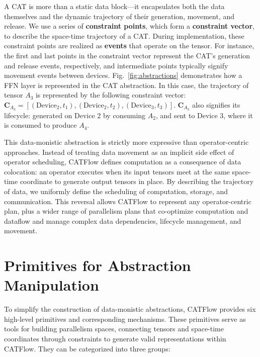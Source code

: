 \documentclass[letterpaper,twocolumn,10pt]{article}
\newcommand{\name}{CATFlow}
\begin{document}
A CAT is more than a static data block—it encapsulates both the data themselves and the dynamic trajectory of their generation, movement, and release. We use a series of \textbf{constraint points}, which form a \textbf{constraint vector}, to describe the space-time trajectory of a CAT. During implementation, these constraint points are realized as \textbf{events} that operate on the tensor. For instance, the first and last points in the constraint vector represent the CAT's generation and release events, respectively, and intermediate points typically signify movement events between devices. Fig.~\ref{fig:abstractions} demonstrates how a FFN layer is represented in the CAT abstraction. In this case, the trajectory of tensor $A_3$ is represented by the following constraint vector: $\mathbf{C}_{A_3} = [(\mathrm{Device}_2, t_1), (\mathrm{Device}_2, t_2), (\mathrm{Device}_3, t_3)]$. $\mathbf{C}_{A_3}$ also signifies its lifecycle: generated on Device 2 by consuming $A_2$, and sent to Device 3, where it is consumed to produce $A_4$.

This data-monistic abstraction is strictly more expressive than operator-centric approaches. Instead of treating data movement as an implicit side effect of operator scheduling, \name{} defines computation as a consequence of data colocation: an operator executes when its input tensors meet at the same space-time coordinate to generate output tensors in place. By describing the trajectory of data, we uniformly define the scheduling of computation, storage, and communication. This reversal allows \name{} to represent any operator-centric plan, plus a wider range of parallelism plans that co-optimize computation and dataflow and manage complex data dependencies, lifecycle management, and movement.

\section{Primitives for Abstraction Manipulation}
\label{sec:primitives}


To simplify the construction of data-monistic abstractions, \name{} provides six high-level primitives and corresponding mechanisms. These primitives serve as tools for building parallelism spaces, connecting tensors and space-time coordinates through constraints to generate valid representations within \name{}. They can be categorized into three groups:
\end{document}
